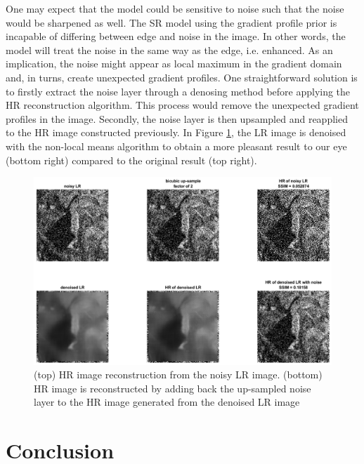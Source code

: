 \documentclass[a4paper,11pt]{article}
\begin{document}
One may expect that the model could be sensitive to noise such that the noise would be sharpened as well. The SR model using the gradient profile prior is incapable of differing between edge and noise in the image. In other words, the model will treat the noise in the same way as the edge, i.e. enhanced. As an implication, the noise might appear as local maximum in the gradient domain and, in turns, create unexpected gradient profiles. One straightforward solution is to firstly extract the noise layer through a denosing method before applying the HR reconstruction algorithm. This process would remove the unexpected gradient profiles in the image. Secondly, the noise layer is then upsampled and reapplied to the HR image constructed previously. In Figure \ref{fig:sden}, the LR image is denoised with the non-local means algorithm \cite{nlm05} to obtain a more pleasant result to our eye (bottom right) compared to the original result (top right).

\begin{figure}[H]
	\centering
	\includegraphics[width=1\textwidth]{simple denoise.png}
	\caption{(top) HR image reconstruction from the noisy LR image. (bottom) HR image is reconstructed by adding back the up-sampled noise layer to the HR image generated from the denoised LR image}
	\label{fig:sden}
\end{figure}

\section{Conclusion}
\end{document}
